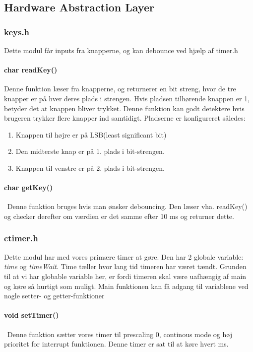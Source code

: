 \subsection{Hardware Abstraction Layer}
\subsubsection{keys.h}
Dette modul får inputs fra knapperne, og kan debounce ved hjælp af timer.h

\paragraph{char readKey()}
Denne funktion læser fra knapperne, og returnerer en bit streng, hvor de tre knapper er på hver deres plads i strengen. Hvis pladsen tilhørende knappen er 1, betyder det at knappen bliver trykket. Denne funktion kan godt detektere hvis brugeren trykker flere knapper ind samtidigt. Pladserne er konfigureret således:
\begin{enumerate}
\item Knappen til højre er på LSB(least significant bit)
\item Den midterste knap er på 1. plads i bit-strengen.
\item Knappen til venstre er på 2. plads i bit-strengen.
\end{enumerate}

\paragraph{char getKey()}\
Denne funktion bruges hvis man ønsker debouncing. Den læser vha. readKey() og checker derefter om værdien er det samme efter 10 ms og returner dette.
\subsubsection{ctimer.h}
Dette modul har med vores primære timer at gøre. Den har 2 globale variable: \textit{time} og \textit{timeWait}. Time tæller hvor lang tid timeren har været tændt. Grunden til at vi har globable variable her, er fordi timeren skal være uafhængig af main og køre så hurtigt som muligt. Main funktionen kan få adgang til variablene ved nogle setter- og getter-funktioner
\paragraph{void setTimer()}\
Denne funktion sætter vores timer til prescaling 0, continous mode og høj prioritet for interrupt funktionen. Denne timer er sat til at køre hvert ms.

